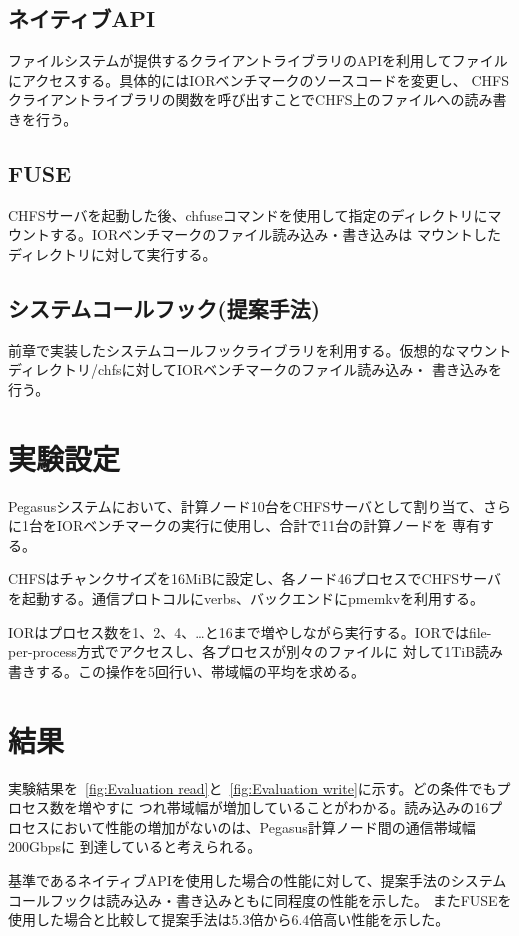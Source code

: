 \documentclass[a4paper,11pt]{jreport}
\begin{document}
\subsection{ネイティブAPI}
ファイルシステムが提供するクライアントライブラリのAPIを利用してファイルにアクセスする。具体的にはIORベンチマークのソースコードを変更し、
CHFSクライアントライブラリの関数を呼び出すことでCHFS上のファイルへの読み書きを行う。
\subsection{FUSE}
CHFSサーバを起動した後、chfuseコマンドを使用して指定のディレクトリにマウントする。IORベンチマークのファイル読み込み・書き込みは
マウントしたディレクトリに対して実行する。
\subsection{システムコールフック(提案手法)}
前章で実装したシステムコールフックライブラリを利用する。仮想的なマウントディレクトリ/chfsに対してIORベンチマークのファイル読み込み・
書き込みを行う。
\section{実験設定}
Pegasusシステムにおいて、計算ノード10台をCHFSサーバとして割り当て、さらに1台をIORベンチマークの実行に使用し、合計で11台の計算ノードを
専有する。

CHFSはチャンクサイズを16MiBに設定し、各ノード46プロセスでCHFSサーバを起動する。通信プロトコルにverbs、バックエンドにpmemkvを利用する。

IORはプロセス数を1、2、4、…と16まで増やしながら実行する。IORではfile-per-process方式でアクセスし、各プロセスが別々のファイルに
対して1TiB読み書きする。この操作を5回行い、帯域幅の平均を求める。
\section{結果}

実験結果を\figurename~\ref{fig:Evaluation read}と\figurename~\ref{fig:Evaluation write}に示す。どの条件でもプロセス数を増やすに
つれ帯域幅が増加していることがわかる。読み込みの16プロセスにおいて性能の増加がないのは、Pegasus計算ノード間の通信帯域幅200Gbpsに
到達していると考えられる。

基準であるネイティブAPIを使用した場合の性能に対して、提案手法のシステムコールフックは読み込み・書き込みともに同程度の性能を示した。
またFUSEを使用した場合と比較して提案手法は5.3倍から6.4倍高い性能を示した。
\end{document}
